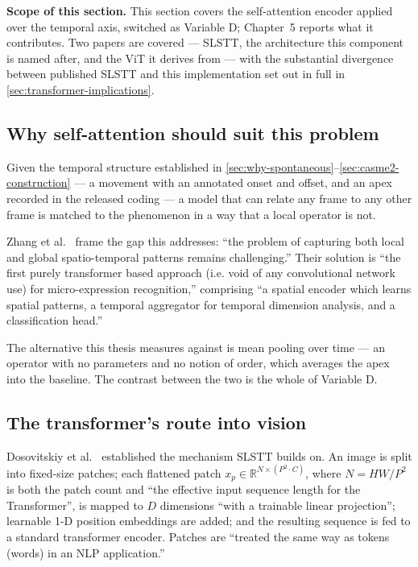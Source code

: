 \textbf{Scope of this section.} This section covers the self-attention encoder applied over the temporal axis, switched as Variable D; Chapter~5 reports what it contributes. Two papers are covered --- SLSTT, the architecture this component is named after, and the ViT it derives from --- with the substantial divergence between published SLSTT and this implementation set out in full in \autoref{sec:transformer-implications}.

\subsection{Why self-attention should suit this problem}
\label{sec:transformer-why}

Given the temporal structure established in \autoref{sec:why-spontaneous}--\autoref{sec:casme2-construction} --- a movement with an annotated onset and offset, and an apex recorded in the released coding --- a model that can relate any frame to any other frame is matched to the phenomenon in a way that a local operator is not.

Zhang et al.~\cite{zhang2022} frame the gap this addresses: ``the problem of capturing both local and global spatio-temporal patterns remains challenging.'' Their solution is ``the first purely transformer based approach (i.e. void of any convolutional network use) for micro-expression recognition,'' comprising ``a spatial encoder which learns spatial patterns, a temporal aggregator for temporal dimension analysis, and a classification head.''

The alternative this thesis measures against is mean pooling over time --- an operator with no parameters and no notion of order, which averages the apex into the baseline. The contrast between the two is the whole of Variable D.

\subsection{The transformer's route into vision}
\label{sec:transformer-vit}

Dosovitskiy et al.~\cite{dosovitskiy2021} established the mechanism SLSTT builds on. An image is split into fixed-size patches; each flattened patch $x_p \in \mathbb{R}^{N \times (P^2 \cdot C)}$, where $N = HW/P^2$ is both the patch count and ``the effective input sequence length for the Transformer'', is mapped to $D$ dimensions ``with a trainable linear projection''; learnable 1-D position embeddings are added; and the resulting sequence is fed to a standard transformer encoder. Patches are ``treated the same way as tokens (words) in an NLP application.''

